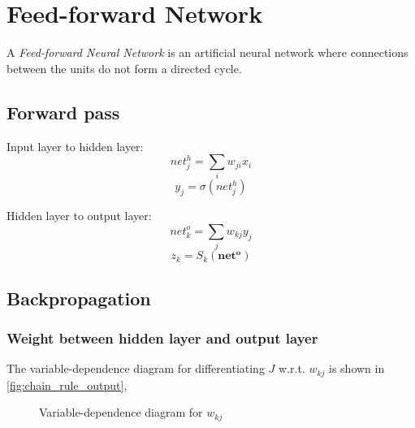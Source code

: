 \documentclass[12pt]{article}
\numberwithin{equation}{section}
\begin{document}
\section{Feed-forward Network} \label{sec:ffnn}
A \textit{Feed-forward Neural Network}\cite{duda2012pattern} is an artificial neural network where connections between the units do not form a directed cycle. 
\subsection{Forward pass}
Input layer to hidden layer:
\begin{equation}
    net^h_j = \sum_i{w_{ji}x_i}
\end{equation}
\begin{equation} \label{eq:hidden_ac}
    y_j = \sigma(net^h_j)
\end{equation}

Hidden layer to output layer:
\begin{equation} \label{eq:ff_netk}
    net^o_k = \sum_j{w_{kj}y_j}
\end{equation}
\begin{equation} \label{eq:output_ac}
    z_k = S_k(\bm{net^o})
\end{equation}

\subsection{Backpropagation}
\subsubsection{Weight between hidden layer and output layer} 
The variable-dependence diagram for differentiating $J$ w.r.t. $w_{kj}$ is shown in \autoref{fig:chain_rule_output},
\begin{figure}[ht]
\begin{center}
  
  
  \caption{Variable-dependence diagram for $w_{kj}$}
  \label{fig:chain_rule_output}
\end{center}
\end{figure}
\end{document}
